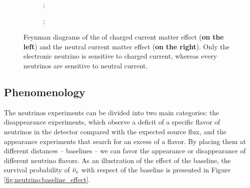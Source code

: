 \begin{figure}[ht]
  \centering
  \begin{subfigure}[t]{0.48\linewidth}
    \centering
    ;
  \end{subfigure}
  \begin{subfigure}[t]{0.48\linewidth}
    \centering
    ;
  \end{subfigure}
  \caption{Feynman diagrams of the of charged current matter effect (\textbf{on the left}) and the neutral current matter effect (\textbf{on the right}). Only the electronic neutrino is sensitive to charged current, whereas every neutrinos are sensitive to neutral current.}
  \label{fig:neutrinos:msw}
\end{figure}

\subsection{Phenomenology}
\label{sec:neutrino:pheno}

The neutrinos experiments can be divided into two main categories: the disappearance experiments, which observe a deficit of a specific flavor of neutrinos in the detector compared with the expected source flux, and the appearance experiments that search for an excess of a flavor. By placing them at different distances -- baselines -- we can favor the appearance or disappearance of different neutrino flavors. As an illustration of the effect of the baseline, the survival probability of $\bar{\nu}_{e}$ with respect of the baseline is presented in Figure \ref{fig:neutrino:baseline_effect}.

